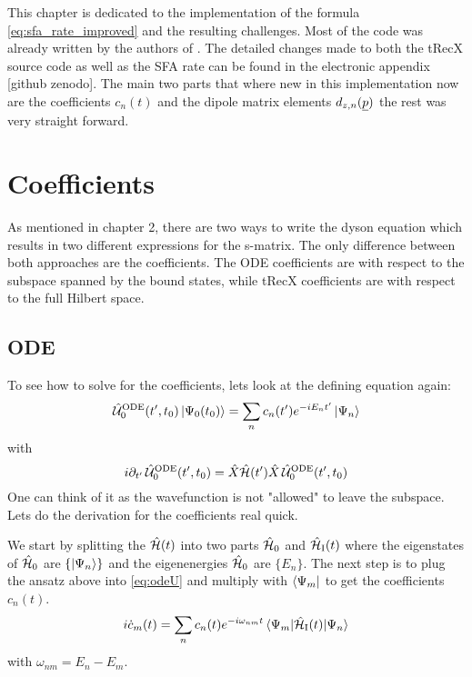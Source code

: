 This chapter is dedicated to the implementation of the formula \eqref{eq:sfa_rate_improved} and the resulting challenges.
Most of the code was already written by the authors of \cite{Theory_NPS}.
The detailed changes made to both the tRecX source code as well as the SFA rate can be found in the electronic appendix [github zenodo].
The main two parts that where new in this implementation now are the coefficients $c_n(t)$ and the dipole matrix elements $d_{z,n}(\underline{p})$ the rest was very straight forward.






\section{Coefficients}
As mentioned in chapter 2, there are two ways to write the dyson equation which results in two different expressions for the s-matrix.
The only difference between both approaches are the coefficients. 
The ODE coefficients are with respect to the subspace spanned by the bound states, while tRecX coefficients are with respect to the full Hilbert space.







\subsection{ODE}
To see how to solve for the coefficients, lets look at the defining equation again:
\begin{equation*}
    \hat{\mathcal{U}}^{\mathrm{ODE}}_0(t',t_0)\ket{\Psi_0(t_0)} = \sum_{n}c_n(t')e^{-iE_nt'}\ket{\Psi_n}
\end{equation*}
with
\begin{equation}
    i\partial_{t'} \, \hat{\mathcal{U}}^{\mathrm{ODE}}_0(t',t_0) = \hat{X}\hat{\mathcal{H}}(t')\hat{X}\,\hat{\mathcal{U}}^{\mathrm{ODE}}_0(t',t_0)    \label{eq:odeU}
\end{equation}
One can think of it as the wavefunction is not "allowed" to leave the subspace. 
Lets do the derivation for the coefficients real quick.

We start by splitting the $\hat{\mathcal{H}}(t)$ into two parts $\hat{\mathcal{H}}_0$ and $\hat{\mathcal{H}}_{\mathrm{I}}(t)$ where the eigenstates of $\hat{\mathcal{H}}_0$ are $\{\ket{\Psi_n}\}$ and the eigenenergies $\hat{\mathcal{H}}_0$ are $\{E_n\}$. 
The next step is to plug the ansatz above into \eqref{eq:odeU} and multiply with $\bra{\Psi_m}$ to get the coefficients $c_n(t)$.
\begin{equation*}
    i  \dot{c}_m(t) = \sum_n c_n(t) e^{-i \omega_{nm} t} \braket{\Psi_m|\hat{\mathcal{H}}_{\mathrm{I}}(t)|\Psi_n}  \label{eq:ode}
\end{equation*}
with $\omega_{nm} = E_n - E_m$.

